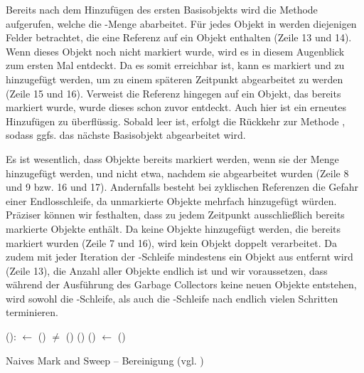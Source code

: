 Bereits nach dem Hinzufügen des ersten Basisobjekts wird die Methode  aufgerufen, welche die -Menge abarbeitet.
Für jedes Objekt in  werden diejenigen Felder betrachtet, die eine Referenz auf ein Objekt enthalten (Zeile 13 und 14).
Wenn dieses Objekt noch nicht markiert wurde, wird es in diesem Augenblick zum ersten Mal entdeckt.
Da es somit erreichbar ist, kann es markiert und zu  hinzugefügt werden, um zu einem späteren Zeitpunkt abgearbeitet zu werden (Zeile 15 und 16).
Verweist die Referenz hingegen auf ein Objekt, das bereits markiert wurde, wurde dieses schon zuvor entdeckt.
Auch hier ist ein erneutes Hinzufügen zu  überflüssig.
Sobald  leer ist, erfolgt die Rückkehr zur Methode , sodass ggfs. das nächste Basisobjekt abgearbeitet wird.


Es ist wesentlich, dass Objekte bereits markiert werden, wenn sie der Menge  hinzugefügt werden, und nicht etwa, nachdem sie abgearbeitet wurden (Zeile 8 und 9 bzw. 16 und 17).
Andernfalls besteht bei zyklischen Referenzen die Gefahr einer Endlosschleife, da unmarkierte Objekte mehrfach hinzugefügt würden.
Präziser können wir festhalten, dass  zu jedem Zeitpunkt ausschließlich bereits markierte Objekte enthält.
Da keine Objekte hinzugefügt werden, die bereits markiert wurden (Zeile 7 und 16), wird kein Objekt doppelt verarbeitet.
Da zudem mit jeder Iteration der \WHILE-Schleife mindestens ein Objekt aus  entfernt wird (Zeile 13), die Anzahl aller Objekte endlich ist und wir voraussetzen, dass während der Ausführung des Garbage Collectors keine neuen Objekte entstehen, wird sowohl die \WHILE-Schleife, als auch die \FOREACH-Schleife nach endlich vielen Schritten terminieren.

\begin{algorithm}
\begin{algorithmic}[1]
	\State {}():
	\State \quad {} $\gets$ ()
	\State \quad \WHILE {} $\neq$ \Null
	\State \quad \quad \IF {}()
	\State \quad \quad \quad {}()
	\State \quad \quad \ELSE {}()
	\State \quad \quad {} $\gets$ ()
\end{algorithmic}
\caption[Naives Mark and Sweep -- Bereinigung]{Naives Mark and Sweep -- Bereinigung (vgl. \cite[Kap. 2.2]{jones-lins})}
\label{algo:naive-sweep}
\end{algorithm}

